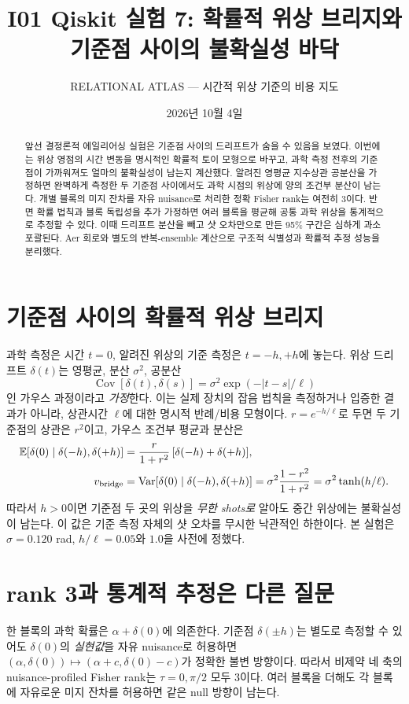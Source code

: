 \documentclass[11pt,a4paper]{article}
\title{I01 Qiskit 실험 7: 확률적 위상 브리지와 기준점 사이의 불확실성 바닥}
\author{RELATIONAL ATLAS --- 시간적 위상 기준의 비용 지도}
\date{2026년 10월 4일}
\begin{document}
\maketitle

\begin{abstract}
앞선 결정론적 에일리어싱 실험은 기준점 사이의 드리프트가 숨을 수
있음을 보였다. 이번에는 위상 영점의 시간 변동을 명시적인 확률적
토이 모형으로 바꾸고, 과학 측정 전후의 기준점이 가까워져도 얼마의
불확실성이 남는지 계산했다. 알려진 영평균 지수상관 공분산을 가정하면
완벽하게 측정한 두 기준점 사이에서도 과학 시점의 위상에 양의 조건부
분산이 남는다. 개별 블록의 미지 잔차를 자유 nuisance로 처리한 정확
Fisher rank는 여전히 3이다. 반면 확률 법칙과 블록 독립성을 추가
가정하면 여러 블록을 평균해 공통 과학 위상을 통계적으로 추정할 수
있다. 이때 드리프트 분산을 빼고 샷 오차만으로 만든 95\% 구간은
심하게 과소포괄된다. Aer 회로와 별도의 반복-ensemble 계산으로
구조적 식별성과 확률적 추정 성능을 분리했다.
\end{abstract}

\section{기준점 사이의 확률적 위상 브리지}
과학 측정은 시간 $t=0$, 알려진 위상의 기준 측정은 $t=-h,+h$에
놓는다. 위상 드리프트 $\delta(t)$는 영평균, 분산 $\sigma^2$,
공분산
\begin{equation}
 \operatorname{Cov}[\delta(t),\delta(s)]
 =\sigma^2\exp(-|t-s|/\ell)
 \label{eq:cov}
\end{equation}
인 가우스 과정이라고 \emph{가정}한다. 이는 실제 장치의 잡음 법칙을
측정하거나 입증한 결과가 아니라, 상관시간 $\ell$에 대한 명시적
반례/비용 모형이다. $r=e^{-h/\ell}$로 두면 두 기준점의 상관은
$r^2$이고, 가우스 조건부 평균과 분산은
\begin{align}
 \mathbb E[\delta(0)\mid\delta(-h),\delta(+h)]
 &=\frac{r}{1+r^2}\,[\delta(-h)+\delta(+h)],\\
 v_{\rm bridge}
 &=\operatorname{Var}[\delta(0)\mid\delta(-h),\delta(+h)]
 =\sigma^2\frac{1-r^2}{1+r^2}
 =\sigma^2\tanh(h/\ell).
 \label{eq:bridge}
\end{align}
따라서 $h>0$이면 기준점 두 곳의 위상을 \emph{무한 shots로} 알아도
중간 위상에는 불확실성이 남는다. 이 값은 기준 측정 자체의 샷
오차를 무시한 낙관적인 하한이다. 본 실험은 $\sigma=0.120$ rad,
$h/\ell=0.05$와 $1.0$을 사전에 정했다.

\section{rank 3과 통계적 추정은 다른 질문}
한 블록의 과학 확률은 $\alpha+\delta(0)$에 의존한다. 기준점
$\delta(\pm h)$는 별도로 측정할 수 있어도 $\delta(0)$의
\emph{실현값}을 자유 nuisance로 허용하면
$(\alpha,\delta(0))\mapsto(\alpha+c,\delta(0)-c)$가 정확한
불변 방향이다. 따라서 비제약 네 축의 nuisance-profiled Fisher
rank는 $\tau=0,\pi/2$ 모두 3이다. 여러 블록을 더해도 각 블록에
자유로운 미지 잔차를 허용하면 같은 null 방향이 남는다.
\end{document}
